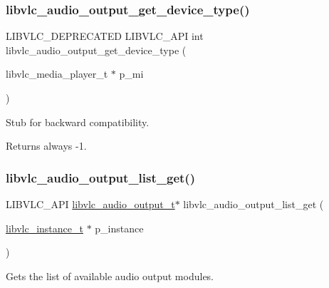 \subsubsection{\texorpdfstring{libvlc\+\_\+audio\+\_\+output\+\_\+get\+\_\+device\+\_\+type()}{libvlc\_audio\_output\_get\_device\_type()}}
{\footnotesize\ttfamily L\+I\+B\+V\+L\+C\+\_\+\+D\+E\+P\+R\+E\+C\+A\+T\+ED L\+I\+B\+V\+L\+C\+\_\+\+A\+PI int libvlc\+\_\+audio\+\_\+output\+\_\+get\+\_\+device\+\_\+type (\begin{DoxyParamCaption}\item[{libvlc\+\_\+media\+\_\+player\+\_\+t $\ast$}]{p\+\_\+mi }\end{DoxyParamCaption})}

Stub for backward compatibility. \begin{DoxyReturn}{Returns}
always -\/1. 
\end{DoxyReturn}
\mbox{\label{group__libvlc__audio_gabdb1104576d289121beb13cb4def720f}} 
\subsubsection{\texorpdfstring{libvlc\+\_\+audio\+\_\+output\+\_\+list\+\_\+get()}{libvlc\_audio\_output\_list\_get()}}
{\footnotesize\ttfamily L\+I\+B\+V\+L\+C\+\_\+\+A\+PI \hyperlink{structlibvlc__audio__output__t}{libvlc\+\_\+audio\+\_\+output\+\_\+t}$\ast$ libvlc\+\_\+audio\+\_\+output\+\_\+list\+\_\+get (\begin{DoxyParamCaption}\item[{\hyperlink{group__libvlc__core_ga316d739a80da4678206c79f4d6c2e284}{libvlc\+\_\+instance\+\_\+t} $\ast$}]{p\+\_\+instance }\end{DoxyParamCaption})}

Gets the list of available audio output modules.


